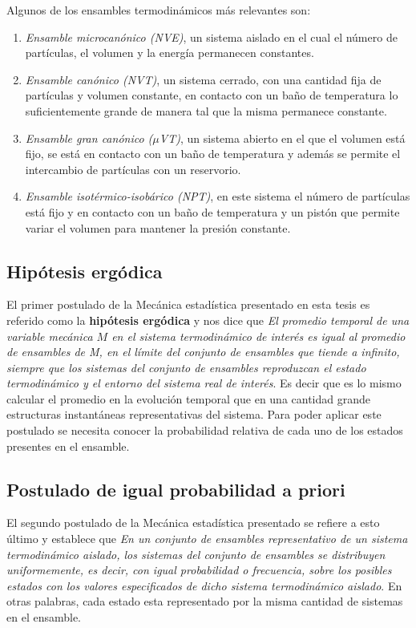 Algunos de los ensambles termodinámicos más relevantes son:
\begin{enumerate}
    \item \textit{Ensamble microcanónico (NVE)}, un sistema aislado en el cual el 
        número de partículas, el volumen y la energía permanecen constantes.
    \item \textit{Ensamble canónico (NVT)}, un sistema cerrado, con una cantidad
        fija de partículas y volumen constante, en contacto con un baño de 
        temperatura lo suficientemente grande de manera tal que la misma permanece 
        constante.
    \item \textit{Ensamble gran canónico ($\mu$VT)}, un sistema abierto en el que
        el volumen está fijo, se está en contacto con un baño de temperatura y
        además se permite el intercambio de partículas con un reservorio.
    \item \textit{Ensamble isotérmico-isobárico (NPT)}, en este sistema el número
        de partículas está fijo y en contacto con un baño de temperatura y un
        pistón que permite variar el volumen para mantener la presión constante.
\end{enumerate}

\subsection{Hipótesis ergódica}

El primer postulado de la Mecánica estadística presentado en esta tesis es 
referido como la \textbf{hipótesis ergódica} y nos dice que \textit{El promedio 
temporal de una variable mecánica $M$ en el sistema termodinámico de interés es 
igual al promedio de ensambles de M, en el límite del conjunto de ensambles que 
tiende a infinito, siempre que los sistemas del conjunto de ensambles reproduzcan 
el estado termodinámico y el entorno del sistema real de interés}. Es decir que
es lo mismo calcular el promedio en la evolución temporal que en una cantidad 
grande estructuras instantáneas representativas del sistema. Para poder aplicar
este postulado se necesita conocer la probabilidad relativa de cada uno de los 
estados presentes en el ensamble.

\subsection{Postulado de igual probabilidad a priori}

El segundo postulado de la Mecánica estadística presentado se refiere a esto
último y establece que \textit{En un conjunto de ensambles representativo de un 
sistema termodinámico aislado, los sistemas del conjunto de ensambles se distribuyen 
uniformemente, es decir, con igual probabilidad o frecuencia, sobre los posibles 
estados con los valores especificados de dicho sistema termodinámico aislado}.
En otras palabras, cada estado esta representado por la misma cantidad de sistemas
en el ensamble.

